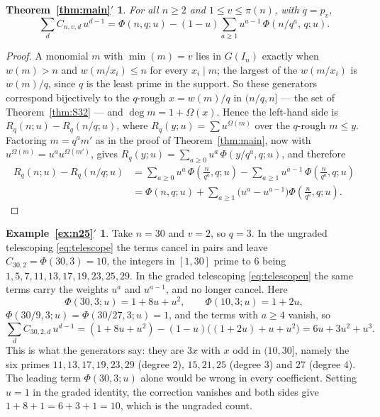 \documentclass[a4paper,11pt,oneside,reqno]{amsart}
\theoremstyle{definition}
\newtheorem*{exampleprime}{Example~\ref*{ex:n25}\({}'\)}
\theoremstyle{remark}
\theoremstyle{plain}
\newtheorem*{thmmainu}{Theorem~\ref*{thm:main}\({}'\)}
\newcommand{\Om}{\Omega}
\begin{document}
\begin{thmmainu}
  For all \(n \ge 2\) and \(1 \le v \le \pi(n)\), with \(q = p_v\),
  \begin{equation}\label{eq:graded}
    \sum_{d}C_{n,v,d}\,u^{d-1}
      = \Phi(n,q;u)-(1-u)\sum_{a \ge 1}u^{a-1}\,\Phi\!\left(n/q^{a},\,q;u\right).
  \end{equation}
\end{thmmainu}

\begin{proof}
  A monomial \(m\) with \(\min(m) = v\) lies in \(G(I_n)\) exactly when
  \(w(m) > n\) and \(w(m/x_i) \le n\) for every \(x_i \mid m\); the largest of the
  \(w(m/x_i)\) is \(w(m)/q\), since \(q\) is the least prime in the support. So
  these generators correspond bijectively to the \(q\)-rough \(x = w(m)/q\) in
  \((n/q,n]\) --- the set of Theorem~\ref{thm:S32} --- and \(\deg m = 1+\Om(x)\).
  Hence the left-hand side is \(R_q(n;u)-R_q(n/q;u)\), where
  \(R_q(y;u) = \sum u^{\Om(m)}\) over the \(q\)-rough \(m \le y\). Factoring
  \(m = q^{a}m'\) as in the proof of Theorem~\ref{thm:main}, now with
  \(u^{\Om(m)} = u^{a}u^{\Om(m')}\), gives
  \(R_q(y;u) = \sum_{a \ge 0}u^{a}\,\Phi(y/q^{a},q;u)\), and therefore
  \begin{equation}\label{eq:telescopeu}
  \begin{split}
    R_q(n;u)-R_q(n/q;u)
      &= \sum_{a \ge 0}u^{a}\,\Phi\!\left(\frac{n}{q^{a}},q;u\right)
        -\sum_{a \ge 1}u^{a-1}\,\Phi\!\left(\frac{n}{q^{a}},q;u\right)\\
      &= \Phi(n,q;u)+\sum_{a \ge 1}\bigl(u^{a}-u^{a-1}\bigr)
        \Phi\!\left(\frac{n}{q^{a}},q;u\right).
  \end{split}
  \end{equation}
\end{proof}

\begin{exampleprime}
  Take \(n = 30\) and \(v = 2\), so \(q = 3\). In the ungraded telescoping
  \eqref{eq:telescope} the terms cancel in pairs and leave
  \(C_{30,2} = \Phi(30,3) = 10\), the integers in \([1,30]\) prime to \(6\)
  being \(1,5,7,11,13,17,19,23,25,29\). In the graded telescoping
  \eqref{eq:telescopeu} the same terms carry the weights \(u^{a}\) and
  \(u^{a-1}\), and no longer cancel. Here
  \[
    \Phi(30,3;u) = 1+8u+u^{2},\qquad \Phi(10,3;u) = 1+2u,
  \]
  \(\Phi(30/9,3;u) = \Phi(30/27,3;u) = 1\), and the terms with \(a \ge 4\)
  vanish, so
  \[
    \sum_{d}C_{30,2,d}\,u^{d-1}
      = (1+8u+u^{2})-(1-u)\bigl((1+2u)+u+u^{2}\bigr)
      = 6u+3u^{2}+u^{3}.
  \]
  This is what the generators say: they are \(3x\) with \(x\) odd in
  \((10,30]\), namely the six primes \(11,13,17,19,23,29\) (degree \(2\)),
  \(15,21,25\) (degree \(3\)) and \(27\) (degree \(4\)). The leading term
  \(\Phi(30,3;u)\) alone would be wrong in every coefficient. Setting \(u = 1\)
  in the graded identity, the correction vanishes and both sides give
  \(1+8+1 = 6+3+1 = 10\), which is the ungraded count.
\end{exampleprime}
\end{document}
